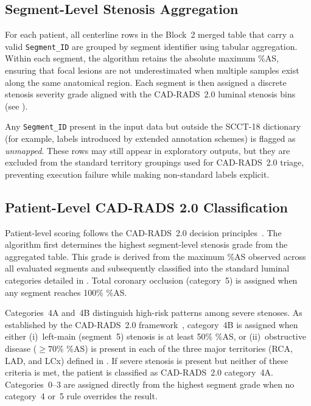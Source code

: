 \subsection{Segment-Level Stenosis Aggregation}
\label{subsec:block3-segment-aggregation}

For each patient, all centerline rows in the Block~2 merged table that carry a valid \texttt{Segment\_ID} are grouped by segment identifier using tabular aggregation. Within each segment, the algorithm retains the absolute maximum \%AS, ensuring that focal lesions are not underestimated when multiple samples exist along the same anatomical region. Each segment is then assigned a discrete stenosis severity grade aligned with the CAD-RADS~2.0 luminal stenosis bins (see ).

Any \texttt{Segment\_ID} present in the input data but outside the SCCT-18 dictionary (for example, labels introduced by extended annotation schemes) is flagged as \emph{unmapped}. These rows may still appear in exploratory outputs, but they are excluded from the standard territory groupings used for CAD-RADS~2.0 triage, preventing execution failure while making non-standard labels explicit.

\subsection{Patient-Level CAD-RADS 2.0 Classification}
\label{subsec:block3-cad-rads}

Patient-level scoring follows the CAD-RADS~2.0 decision principles~\cite{cury2022}. The algorithm first determines the highest segment-level stenosis grade from the aggregated table. This grade is derived from the maximum \%AS observed across all evaluated segments and subsequently classified into the standard luminal categories detailed in . Total coronary occlusion (category~5) is assigned when any segment reaches 100\% \%AS.

Categories~4A and~4B distinguish high-risk patterns among severe stenoses. As established by the CAD-RADS~2.0 framework~\cite{cury2022}, category~4B is assigned when either (i)~left-main (segment~5) stenosis is at least 50\% \%AS, or (ii)~obstructive disease ($\geq 70\%$ \%AS) is present in each of the three major territories (RCA, LAD, and LCx) defined in . If severe stenosis is present but neither of these criteria is met, the patient is classified as CAD-RADS~2.0 category~4A. Categories~0--3 are assigned directly from the highest segment grade when no category~4 or~5 rule overrides the result.

